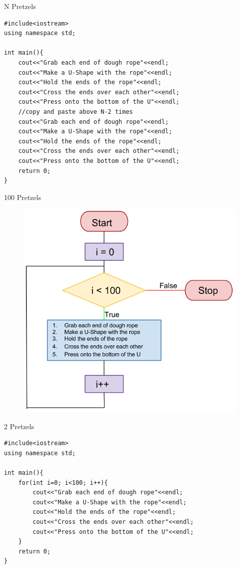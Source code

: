 \documentclass[xcolor={dvipsnames}]{beamer}
\begin{document}
\begin{frame}[fragile]{N Pretzels}
\begin{verbatim}
#include<iostream>
using namespace std;

int main(){
    cout<<"Grab each end of dough rope"<<endl;
    cout<<"Make a U-Shape with the rope"<<endl;
    cout<<"Hold the ends of the rope"<<endl;
    cout<<"Cross the ends over each other"<<endl;
    cout<<"Press onto the bottom of the U"<<endl;
    //copy and paste above N-2 times
    cout<<"Grab each end of dough rope"<<endl;
    cout<<"Make a U-Shape with the rope"<<endl;
    cout<<"Hold the ends of the rope"<<endl;
    cout<<"Cross the ends over each other"<<endl;
    cout<<"Press onto the bottom of the U"<<endl;
    return 0;
}
\end{verbatim}
\end{frame}

\begin{frame}{100 Pretzels}
\begin{figure}
		\includegraphics[width=.75\textwidth]{for_pretzels}
	\end{figure}
\end{frame}

\begin{frame}[fragile]{2 Pretzels}
\begin{verbatim}
#include<iostream>
using namespace std;

int main(){
    for(int i=0; i<100; i++){
        cout<<"Grab each end of dough rope"<<endl;
        cout<<"Make a U-Shape with the rope"<<endl;
        cout<<"Hold the ends of the rope"<<endl;
        cout<<"Cross the ends over each other"<<endl;
        cout<<"Press onto the bottom of the U"<<endl;
    }
    return 0;
}
\end{verbatim}
\end{frame}
\end{document}
